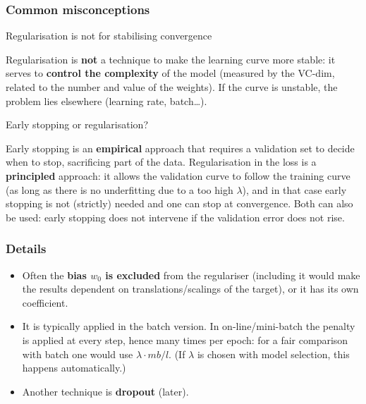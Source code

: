 \subsubsection{Common
misconceptions}\label{fraintendimenti-frequenti}

\begin{boxwarning}{Regularisation is not for stabilising convergence}

Regularisation is \textbf{not} a technique to make the learning curve
more stable: it serves to \textbf{control the complexity} of the model
(measured by the VC-dim, related to the number and value of the
weights). If the curve is unstable, the problem lies elsewhere
(learning rate, batch\ldots).

\end{boxwarning}

\begin{boxquestion}{Early stopping or regularisation?}

Early stopping is an \textbf{empirical} approach that requires a
validation set to decide when to stop, sacrificing part of the data.
Regularisation in the loss is a \textbf{principled} approach: it allows
the validation curve to follow the training curve (as long as there is
no underfitting due to a too high \(\lambda\)), and in that case early
stopping is not (strictly) needed and one can stop at convergence. Both
can also be used: early stopping does not intervene if the validation
error does not rise.

\end{boxquestion}

\subsubsection{Details}\label{dettagli}

\begin{itemize}
\tightlist
\item
  Often the \textbf{bias \(w_0\) is excluded} from the regulariser
  (including it would make the results dependent on
  translations/scalings of the target), or it has its own coefficient.
\item
  It is typically applied in the batch version. In on-line/mini-batch
  the penalty is applied at every step, hence many times per epoch: for
  a fair comparison with batch one would use \(\lambda\cdot mb/l\). (If
  \(\lambda\) is chosen with model selection, this happens
  automatically.)
\item
  Another technique is \textbf{dropout} (later).
\end{itemize}


